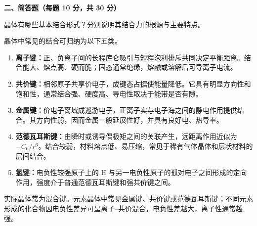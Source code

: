 \textbf{二、简答题（每题 10 分，共 30 分）}

\begin{question}[10 分]
晶体有哪些基本结合形式？分别说明其结合力的根源与主要特点。


\begin{solution}
晶体中常见的结合可归纳为以下五类。
\begin{enumerate}
  \item \textbf{离子键：}正、负离子间的长程库仑吸引与短程泡利排斥共同决定平衡距离。结合能大、熔点高、硬而脆；固态通常绝缘，熔融或溶解后可导离子电流。
  \item \textbf{共价键：}相邻原子共享价电子，成键态占据使能量降低。它具有明显方向性和饱和性，通常结合强、硬度高、导电性取决于能带是否有隙。
  \item \textbf{金属键：}价电子离域成巡游电子，正离子实与电子海之间的静电作用提供结合。其方向性弱，因而金属一般延展性好，并具有良好电、热导率。
  \item \textbf{范德瓦耳斯键：}由瞬时或诱导偶极矩之间的关联产生，远距离作用近似为 $-C_6/r^6$。结合较弱，材料熔点低、易压缩，常见于稀有气体晶体和层状材料的层间结合。
  \item \textbf{氢键：}电负性较强原子上的 H 与另一电负性原子的孤对电子之间形成的定向作用，强度介于普通范德瓦耳斯键和强共价键之间。
\end{enumerate}
实际晶体常为混合键。元素晶体中常见金属键、共价键或范德瓦耳斯键；不同元素形成的化合物因电负性差异可呈离子--共价混合，电负性差越大，离子性通常越强。
\end{solution}
\end{question}

